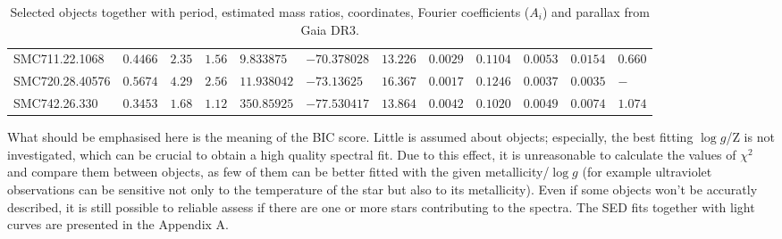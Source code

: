 \documentclass{pracalicmgr}
\begin{document}
\begin{table}[H]
{\begin{tabular}{llllllllllll}
    SMC711.22.1068  & $0.4466$  & $2.35$  & $1.56$ & $9.833875$   & $-70.378028$ & $13.226$ & $0.0029$  & $0.1104$ & $0.0053$  & $0.0154$ & $ 0.660$     \\[0.1cm]
    SMC720.28.40576 & $0.5674$ & $4.29$  & $2.56$ & $11.938042$  & $-73.13625$  & $16.367$  & $0.0017$ & $0.1246$ & $0.0037$  & $0.0035$ &  $-$    \\[0.1cm]
    SMC742.26.330   & $0.3453$ & $1.68$ & $1.12$ & $350.85925$  & $-77.530417$ & $13.864$ & $0.0042$   & $0.1020$ & $0.0049$ & $0.0074$ & $ 1.074$   \\[0.1cm]
    \hline
    \end{tabular}
    }
    \caption{Selected objects together with period, estimated mass ratios, coordinates, Fourier coefficients ($A_i$) and parallax from Gaia DR3.}\label{objects}
\end{table}
What should be emphasised here is the meaning of the BIC score. Little is assumed about objects; especially, the best fitting
$\log{g}$/Z is not investigated, which can be crucial to obtain a high quality spectral fit. Due to this effect, it is unreasonable to calculate the values of $\chi^2$ and compare them
between objects, as few of them can be better fitted with the given metallicity/$\log{g}$
(for example ultraviolet observations can be sensitive not only to the temperature of the star but also to its metallicity).
Even if some objects won't be accuratly described, it is still possible to reliable assess if there are one or more stars contributing to the spectra.
The SED fits together with light curves are presented in the Appendix A.
\end{document}
